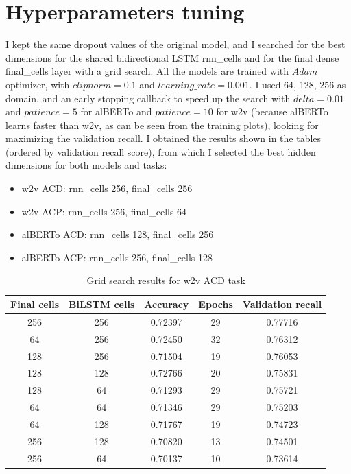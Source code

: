 \documentclass{article}
\begin{document}
    \section{Hyperparameters tuning}\label{subsec:hyperparameters-tuning}
            I kept the same dropout values of the original model, and I searched for the best dimensions for the shared bidirectional LSTM rnn\_cells and for the final dense final\_cells layer with a grid search.
            All the models are trained with $Adam$ optimizer, with $clipnorm=0.1$ and $learning\_rate=0.001$.
            I used {64, 128, 256} as domain, and an early stopping callback to speed up the search with $delta=0.01$ and $patience=5$ for alBERTo and $patience=10$ for w2v (because alBERTo learns faster than w2v, as can be seen from the training plots), looking for maximizing the validation recall.
            I obtained the results shown in the tables (ordered by validation recall score), from which I selected the best hidden dimensions for both models and tasks:
            \begin{itemize}
                \item w2v ACD: rnn\_cells 256, final\_cells 256
                \item w2v ACP: rnn\_cells 256, final\_cells 64
                \item alBERTo ACD: rnn\_cells 128, final\_cells 256
                \item alBERTo ACP: rnn\_cells 256, final\_cells 128
            \end{itemize}
                \begin{table}[h!]
                \begin{center}
                \caption{Grid search results for w2v ACD task}
                \label{tab:table6}
                \begin{tabular}{c|c|c|c|c}
                    \textbf{Final cells} & \textbf{BiLSTM cells} & \textbf{Accuracy} & \textbf{Epochs} & \textbf{Validation recall}\\
                    \hline
                        256 & 256 & 0.72397 & 29 & 0.77716\\
                        64  & 256 & 0.72450 & 32 & 0.76312\\
                        128 & 256 & 0.71504 & 19 & 0.76053\\
                        128 & 128 & 0.72766 & 20 & 0.75831\\
                        128 & 64  & 0.71293 & 29 & 0.75721\\
                        64  & 64  & 0.71346 & 29 & 0.75203\\
                        64  & 128 & 0.71767 & 19 & 0.74723\\
                        256 & 128 & 0.70820 & 13 & 0.74501\\
                        256 & 64  & 0.70137 & 10 & 0.73614\\
                \end{tabular}
                \end{center}
            \end{table}
\end{document}
